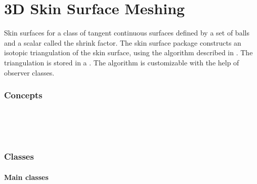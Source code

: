 
\chapter{3D Skin Surface Meshing}
\label{chapterSkinSurfaceRef}

Skin surfaces for a class of tangent continuous surfaces defined by a
set of balls and a scalar called the shrink factor. The skin surface
package constructs an isotopic triangulation of the skin surface,
using the algorithm described in \cite{cgal:kv-mssct-05}. The
triangulation is stored in a . The algorithm
is customizable with the help of observer classes.

\subsection*{Concepts}
\\
\\
\\
\subsection*{Classes}
\subsubsection*{Main classes}

\\

\\
\\

